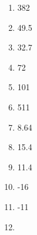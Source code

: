 \documentclass[../uilmath.tex]{subfiles}
\begin{document}
\begin{enumerate}[label=\bfseries\arabic*.]
    \item %
    382

    \item %
    49.5

    \item %
    32.7

    \item %
    72

    \item %
    101

    \item %
    511

    \item %
    8.64

    \item %
    15.4

    \item %
    11.4

    \item %
    -16

    \item %
    -11

    \item %
    
\end{enumerate}
\end{document}
